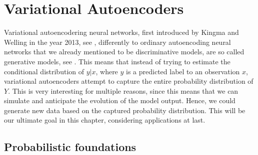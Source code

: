 \chapter{Variational Autoencoders}\label{chap:vae}

Variational autoencodering neural networks, first introduced by Kingma and Welling in the year 2013, see \cite{kingma2013auto}, differently to ordinary autoencoding neural networks that we already mentioned to be discriminative models, are so called generative models, see \cite[Chapter~5]{cinelli2021variational}. This means that instead of trying to estimate the conditional distribution of $y|x$, where $y$ is a predicted label to an observation $x$, variational autoencoders attempt to capture the entire probability distribution of $Y$. This is very interesting for multiple reasons, since this means that we can simulate and anticipate the evolution of the model output. Hence, we could generate new data based on the captured probability distribution. This will be our ultimate goal in this chapter, considering applications at last.

\section{Probabilistic foundations}

